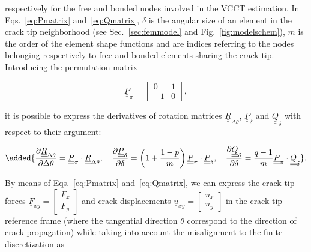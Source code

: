 \documentclass[review]{elsarticle}
\begin{document}
respectively for the free and bonded nodes involved in the VCCT estimation. In Eqs.~\ref{eq:Pmatrix} and~\ref{eq:Qmatrix}, $\delta$ is the angular size of an element in the crack tip neighborhood (see Sec.~\ref{sec:femmodel} and Fig.~\ref{fig:modelschem}), $m$ is the order of the element shape functions and  are indices referring to the nodes belonging respectively to free and bonded elements sharing the crack tip.  Introducing the permutation matrix


\begin{equation}
\underline{\underline{P}}_{\pi}=\begin{bmatrix}
0 & 1\\
-1& 0
\end{bmatrix},
\end{equation}

it is possible to express the derivatives of rotation matrices $\underline{\underline{R}}_{\Delta\theta}$, $\underline{\underline{P}}_{\delta}$ and $\underline{\underline{Q}}_{\delta}$ with respect to their argument:

\begin{equation}\label{eq:rotmatdev}
\added{\frac{\partial \underline{\underline{R}}_{\Delta\theta}}{\partial \Delta\theta}=\underline{\underline{P}}_{\pi}\cdot\underline{\underline{R}}_{\Delta\theta},\quad\frac{\partial \underline{\underline{P}}_{\delta}}{\partial \delta}=\left(1+\frac{1-p}{m}\right)\underline{\underline{P}}_{\pi}\cdot\underline{\underline{P}}_{\delta},\quad\frac{\partial \underline{\underline{Q}}_{\delta}}{\partial \delta}=\frac{q-1}{m}\underline{\underline{P}}_{\pi}\cdot\underline{\underline{Q}}_{\delta}}.
\end{equation}

By means of Eqs.~\ref{eq:Pmatrix} and~\ref{eq:Qmatrix}, we can express the crack tip forces $
\underline{F}_{xy}=\begin{bmatrix}
F_{x} \\
F_{y}
\end{bmatrix}$ and crack displacements  $
\underline{u}_{xy}=\begin{bmatrix}
u_{x} \\
u_{y}
\end{bmatrix}$ in the crack tip reference frame (where the tangential direction $\theta$ correspond to the direction of crack propagation) while taking into account the misalignment to the finite  discretization as 
\end{document}
